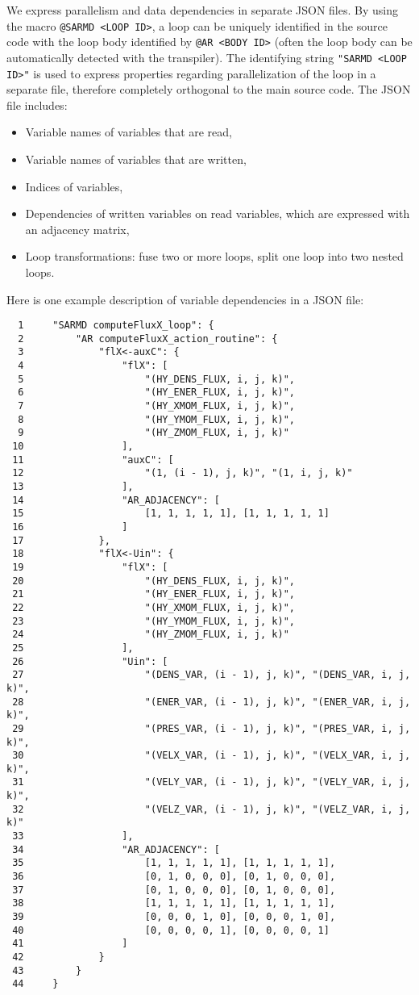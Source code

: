 \documentclass{article}
\begin{document}
We express parallelism and data dependencies in separate JSON files.  By using
the macro \texttt{@SARMD <LOOP ID>}, a loop can be uniquely identified in the
source code with the loop body identified by \texttt{@AR <BODY ID>} (often the
loop body can be automatically detected with the transpiler).  The identifying
string \texttt{"SARMD <LOOP ID>"} is used to express properties regarding
parallelization of the loop in a separate file, therefore completely orthogonal
to the main source code.  The JSON file includes:
\begin{itemize}
  \item Variable names of variables that are read,
  \item Variable names of variables that are written,
  \item Indices of variables,
  \item Dependencies of written variables on read variables, which are
    expressed with an adjacency matrix,
  \item Loop transformations: fuse two or more loops, split one loop into two
    nested loops.
\end{itemize}
Here is one example description of variable dependencies in a JSON file:
\begin{verbatim}
  1     "SARMD computeFluxX_loop": {
  2         "AR computeFluxX_action_routine": {
  3             "flX<-auxC": {
  4                 "flX": [
  5                     "(HY_DENS_FLUX, i, j, k)",
  6                     "(HY_ENER_FLUX, i, j, k)",
  7                     "(HY_XMOM_FLUX, i, j, k)",
  8                     "(HY_YMOM_FLUX, i, j, k)",
  9                     "(HY_ZMOM_FLUX, i, j, k)"
 10                 ],
 11                 "auxC": [
 12                     "(1, (i - 1), j, k)", "(1, i, j, k)"
 13                 ],
 14                 "AR_ADJACENCY": [
 15                     [1, 1, 1, 1, 1], [1, 1, 1, 1, 1]
 16                 ]
 17             },
 18             "flX<-Uin": {
 19                 "flX": [
 20                     "(HY_DENS_FLUX, i, j, k)",
 21                     "(HY_ENER_FLUX, i, j, k)",
 22                     "(HY_XMOM_FLUX, i, j, k)",
 23                     "(HY_YMOM_FLUX, i, j, k)",
 24                     "(HY_ZMOM_FLUX, i, j, k)"
 25                 ],
 26                 "Uin": [
 27                     "(DENS_VAR, (i - 1), j, k)", "(DENS_VAR, i, j, k)",
 28                     "(ENER_VAR, (i - 1), j, k)", "(ENER_VAR, i, j, k)",
 29                     "(PRES_VAR, (i - 1), j, k)", "(PRES_VAR, i, j, k)",
 30                     "(VELX_VAR, (i - 1), j, k)", "(VELX_VAR, i, j, k)",
 31                     "(VELY_VAR, (i - 1), j, k)", "(VELY_VAR, i, j, k)",
 32                     "(VELZ_VAR, (i - 1), j, k)", "(VELZ_VAR, i, j, k)"
 33                 ],
 34                 "AR_ADJACENCY": [
 35                     [1, 1, 1, 1, 1], [1, 1, 1, 1, 1],
 36                     [0, 1, 0, 0, 0], [0, 1, 0, 0, 0],
 37                     [0, 1, 0, 0, 0], [0, 1, 0, 0, 0],
 38                     [1, 1, 1, 1, 1], [1, 1, 1, 1, 1],
 39                     [0, 0, 0, 1, 0], [0, 0, 0, 1, 0],
 40                     [0, 0, 0, 0, 1], [0, 0, 0, 0, 1]
 41                 ]
 42             }
 43         }
 44     }
\end{verbatim}
\end{document}
